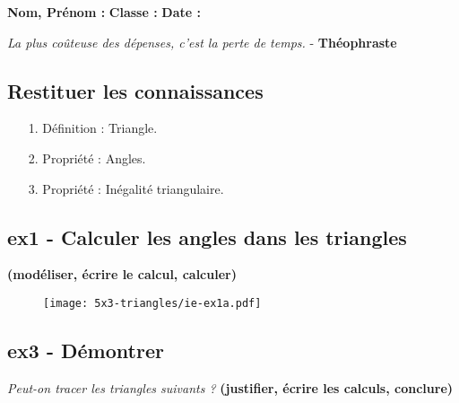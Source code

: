 



\textbf{Nom, Prénom :} \hspace{8cm} \textbf{Classe :} \hspace{3cm} \textbf{Date :}\\

\begin{center}
  \textit{La plus coûteuse des dépenses, c’est la perte de temps.}  - \textbf{Théophraste}
\end{center}

\subsection*{Restituer les connaissances}

\begin{enumerate}
  \item[1.] Définition : Triangle. \newline \Pointilles[1]
  \item[2.] Propriété : Angles. \newline \Pointilles[1]
  \item[3.] Propriété : Inégalité triangulaire. \newline \Pointilles[1]
\end{enumerate}

\subsection*{ex1 - Calculer les angles dans les triangles}
\textbf{(modéliser, écrire le calcul, calculer)}

\begin{figure}[H]
  \centering
  \texttt{[image: 5x3-triangles/ie-ex1a.pdf]}
\end{figure}

\begin{multicols}{4}
\Pointilles[3] 
\columnbreak 

\Pointilles[3] 
\columnbreak 

\Pointilles[3] 
\columnbreak 

\Pointilles[3] 
\columnbreak 
\end{multicols}


\subsection*{ex3 - Démontrer}
\textit{Peut-on tracer les triangles suivants ?}
\textbf{(justifier, écrire les calculs, conclure)}


